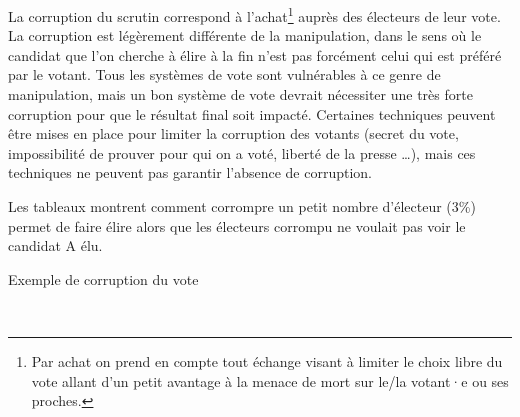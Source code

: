 \documentclass[../report]{subfiles}
\begin{document}
  La corruption du scrutin correspond à l'achat\footnote{Par achat on prend en compte 
  tout échange visant à limiter le choix libre du vote allant d'un petit avantage à la menace 
  de mort sur le/la votant·e ou ses proches.} auprès des électeurs de leur vote.
  La corruption est légèrement différente de la manipulation, dans le sens où le candidat
  que l'on cherche à élire à la fin n'est pas forcément celui qui est préféré par le votant.
  Tous les systèmes de vote sont vulnérables à ce genre de manipulation, mais un bon système de 
  vote devrait nécessiter une très forte corruption pour que le résultat final soit impacté.
  Certaines techniques peuvent être mises en place pour limiter la corruption des votants (secret
  du vote, impossibilité de prouver pour qui on a voté, liberté de la presse …), mais 
  ces techniques ne peuvent pas garantir l'absence de corruption.
  
  Les tableaux  montrent comment corrompre un petit nombre d'électeur 
  (3\%) permet de faire élire alors que les électeurs corrompu ne voulait pas voir le candidat A élu.
  
  
  \begin{table}[h]
  	\begin{center}
  		\caption{Exemple de corruption du vote}%
  		\label{fig:critere:corruption:example}
  		\\[1em]
  	\end{center}
  \end{table}
  
\end{document}
